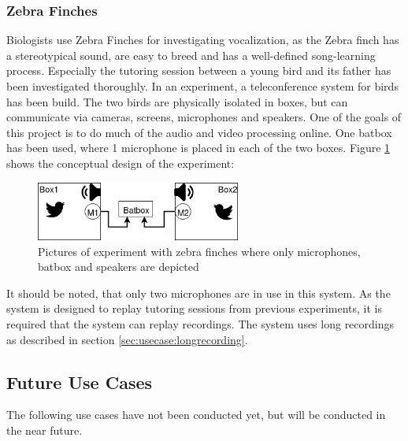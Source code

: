 \subsubsection{Zebra Finches}
Biologists use Zebra Finches for investigating vocalization, as the Zebra finch has a stereotypical sound, are easy to breed and has a well-defined song-learning process. Especially the tutoring session between a young bird and its father has been investigated thoroughly. In an experiment, a teleconference system for birds has been build. The two birds are physically isolated in boxes, but can communicate via cameras, screens, microphones and speakers. One of the goals of this project is to do much of the audio and video processing online. One batbox has been used, where 1 microphone is placed in each of the two boxes.\citep{larsen2016system}
Figure \ref{fig:usecases:zebra:overview} shows the conceptual design of the experiment:

\begin{figure}[h!]
	\centering
	\includegraphics[width=0.6\textwidth]{figures/zebrafinches_experiment1.png}
	\caption{Pictures of experiment with zebra finches where only microphones, batbox and speakers are depicted}\label{fig:usecases:zebra:overview}
\end{figure}
It should be noted, that only two microphones are in use in this system.
As the system is designed to replay tutoring sessions from previous experiments, it is required that the system can replay recordings.
The system uses long recordings as described in section \ref{sec:usecase:longrecording}.


\subsection{Future Use Cases}
The following use cases have not been conducted yet, but will be conducted in the near future.

